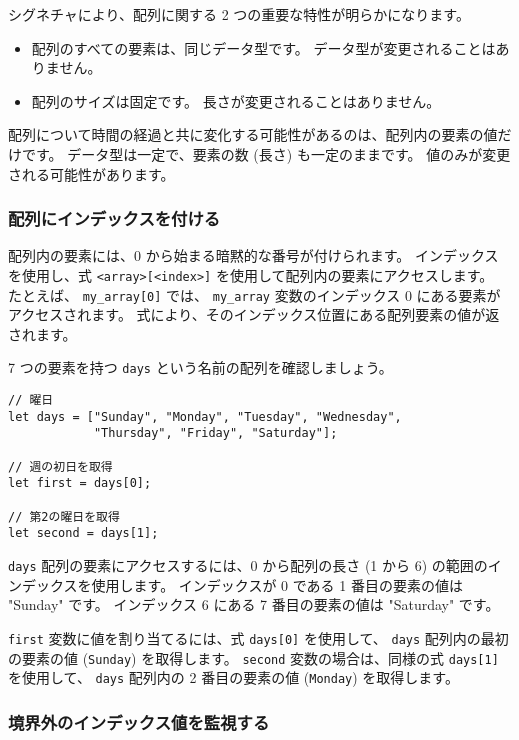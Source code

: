 シグネチャにより、配列に関する 2 つの重要な特性が明らかになります。

\begin{itemize}
\item 配列のすべての要素は、同じデータ型です。 データ型が変更されることはありません。
\item 配列のサイズは固定です。 長さが変更されることはありません。
\end{itemize}

配列について時間の経過と共に変化する可能性があるのは、配列内の要素の値だけです。 データ型は一定で、要素の数 (長さ) も一定のままです。 値のみが変更される可能性があります。

\subsubsection{配列にインデックスを付ける}

配列内の要素には、0 から始まる暗黙的な番号が付けられます。 インデックスを使用し、式 \texttt{<array>[<index>]} を使用して配列内の要素にアクセスします。 たとえば、 \texttt{my\_array[0]} では、 \texttt{my\_array} 変数のインデックス 0 にある要素がアクセスされます。 式により、そのインデックス位置にある配列要素の値が返されます。

7 つの要素を持つ \texttt{days} という名前の配列を確認しましょう。

\begin{lstlisting}[numbers=none]
// 曜日
let days = ["Sunday", "Monday", "Tuesday", "Wednesday",
            "Thursday", "Friday", "Saturday"];

// 週の初日を取得
let first = days[0];

// 第2の曜日を取得
let second = days[1];
\end{lstlisting}

\texttt{days} 配列の要素にアクセスするには、0 から配列の長さ (1 から 6) の範囲のインデックスを使用します。 インデックスが 0 である 1 番目の要素の値は "Sunday" です。 インデックス 6 にある 7 番目の要素の値は "Saturday" です。

\texttt{first} 変数に値を割り当てるには、式 \texttt{days[0]} を使用して、 \texttt{days} 配列内の最初の要素の値 (\texttt{Sunday}) を取得します。 \texttt{second} 変数の場合は、同様の式 \texttt{days[1]} を使用して、 \texttt{days} 配列内の 2 番目の要素の値 (\texttt{Monday}) を取得します。

\subsubsection{境界外のインデックス値を監視する}

